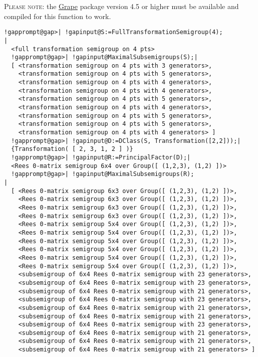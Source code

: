 \documentclass[a4paper,11pt]{report}
\begin{document}
{{{ \textsc{Please note:} the \href{http://www.maths.qmul.ac.uk/~leonard/grape/} {Grape} package version 4.5 or higher must be available and compiled for this function
to work. 
\begin{Verbatim}[commandchars=!@|,fontsize=\small,frame=single,label=Example]
  !gapprompt@gap>| !gapinput@S:=FullTransformationSemigroup(4);                              |
  <full transformation semigroup on 4 pts>
  !gapprompt@gap>| !gapinput@MaximalSubsemigroups(S);|
  [ <transformation semigroup on 4 pts with 3 generators>, 
    <transformation semigroup on 4 pts with 5 generators>, 
    <transformation semigroup on 4 pts with 4 generators>, 
    <transformation semigroup on 4 pts with 4 generators>, 
    <transformation semigroup on 4 pts with 5 generators>, 
    <transformation semigroup on 4 pts with 4 generators>, 
    <transformation semigroup on 4 pts with 5 generators>, 
    <transformation semigroup on 4 pts with 5 generators>, 
    <transformation semigroup on 4 pts with 4 generators> ]
  !gapprompt@gap>| !gapinput@D:=DClass(S, Transformation([2,2]));|
  {Transformation( [ 2, 3, 1, 2 ] )}
  !gapprompt@gap>| !gapinput@R:=PrincipalFactor(D);|
  <Rees 0-matrix semigroup 6x4 over Group([ (1,2,3), (1,2) ])>
  !gapprompt@gap>| !gapinput@MaximalSubsemigroups(R);                                       |
  [ <Rees 0-matrix semigroup 6x3 over Group([ (1,2,3), (1,2) ])>, 
    <Rees 0-matrix semigroup 6x3 over Group([ (1,2,3), (1,2) ])>, 
    <Rees 0-matrix semigroup 6x3 over Group([ (1,2,3), (1,2) ])>, 
    <Rees 0-matrix semigroup 6x3 over Group([ (1,2,3), (1,2) ])>, 
    <Rees 0-matrix semigroup 5x4 over Group([ (1,2,3), (1,2) ])>, 
    <Rees 0-matrix semigroup 5x4 over Group([ (1,2,3), (1,2) ])>, 
    <Rees 0-matrix semigroup 5x4 over Group([ (1,2,3), (1,2) ])>, 
    <Rees 0-matrix semigroup 5x4 over Group([ (1,2,3), (1,2) ])>, 
    <Rees 0-matrix semigroup 5x4 over Group([ (1,2,3), (1,2) ])>, 
    <Rees 0-matrix semigroup 5x4 over Group([ (1,2,3), (1,2) ])>, 
    <subsemigroup of 6x4 Rees 0-matrix semigroup with 23 generators>, 
    <subsemigroup of 6x4 Rees 0-matrix semigroup with 23 generators>, 
    <subsemigroup of 6x4 Rees 0-matrix semigroup with 21 generators>, 
    <subsemigroup of 6x4 Rees 0-matrix semigroup with 23 generators>, 
    <subsemigroup of 6x4 Rees 0-matrix semigroup with 21 generators>, 
    <subsemigroup of 6x4 Rees 0-matrix semigroup with 21 generators>, 
    <subsemigroup of 6x4 Rees 0-matrix semigroup with 23 generators>, 
    <subsemigroup of 6x4 Rees 0-matrix semigroup with 21 generators>, 
    <subsemigroup of 6x4 Rees 0-matrix semigroup with 21 generators>, 
    <subsemigroup of 6x4 Rees 0-matrix semigroup with 21 generators> ]
\end{Verbatim}
 }

}}
\end{document}
